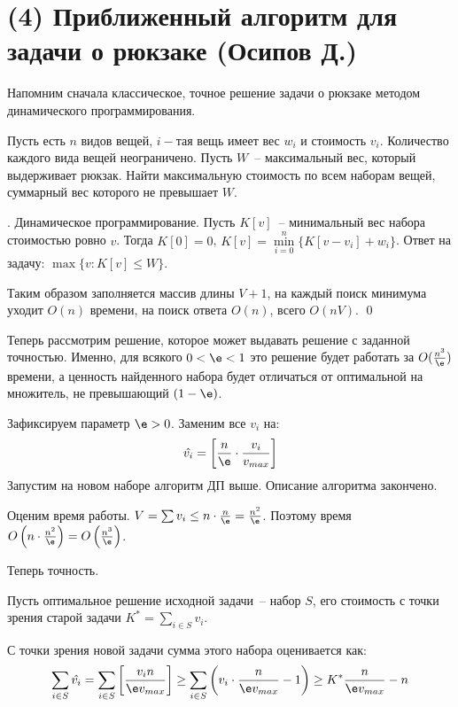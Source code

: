 \section{(4) Приближенный алгоритм для задачи о рюкзаке (Осипов Д.)}
Напомним сначала классическое, точное решение задачи о рюкзаке методом динамического программирования.

\begin{problem*}
	Пусть есть $n$ видов вещей, $i-$тая вещь имеет вес $w_i$ и стоимость $v_i$. Количество каждого вида вещей неограничено. Пусть $W$~-- максимальный вес, который выдерживает рюкзак. Найти максимальную стоимость по всем наборам вещей, суммарный вес которого не превышает $W$.
\end{problem*}

. Динамическое программирование. Пусть $K[v]$~-- минимальный вес набора стоимостью ровно $v$. Тогда $K[0] = 0$, $K[v] = \underset{i=0}{\overset{n}{\min}} \{K[v-v_i] + w_i\}$. Ответ на задачу: $\max\{v : K[v] \leq W\}$.

Таким образом заполняется массив длины $V+1$, на каждый поиск минимума уходит $O(n)$ времени, на поиск ответа $O(n)$, всего $O(nV)$.  \qed

Теперь рассмотрим решение, которое может выдавать решение с заданной точностью. Именно, для всякого $0 < \e < 1$ это решение будет работать за $O(\frac{n^3}{\e})$ времени, а ценность найденного набора будет отличаться от оптимальной на множитель, не превышающий $(1-\e)$.


Зафиксируем параметр $\e>0$. Заменим все $v_i$ на: $$\hat{v_i} = \left[\frac{n}{\e} \cdot \frac{v_i}{v_{max}}\right]$$ Запустим на новом наборе алгоритм ДП выше. Описание алгоритма закончено.

Оценим время работы. $V = \sum v_i \leq n\cdot \frac{n}{\e} = \frac{n^2}{\e}$. Поэтому время $O\left(n \cdot \frac{n^2}{\e}\right) = O\left(\frac{n^3}{\e}\right)$.

Теперь точность.

Пусть оптимальное решение исходной задачи~-- набор $S$, его стоимость с точки зрения старой задачи $K^* = \sum\limits_{i\in S} v_i$.

С точки зрения новой задачи сумма этого набора оценивается как:
$$\sum_{i\in S}\hat{v_i} = \sum_{i\in S} \left[\frac{v_i n}{\e v_{max}}\right] \geq \sum_{i\in S} \left(v_i \cdot \frac{n}{\e v_{max}} - 1\right) \geq K^*\frac{n}{\e v_{max}} - n$$

